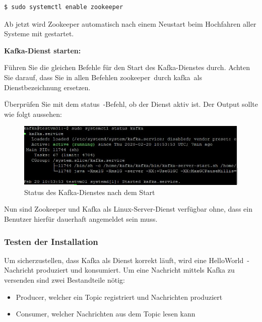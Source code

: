\documentclass[a4paper,titlepage,halfparskip,12pt]{scrreprt}
\begin{document}
\begin{onehalfspacing}
\smallskip

\begin{lstlisting}[language=Bash]
$ sudo systemctl enable zookeeper
\end{lstlisting}

Ab jetzt wird Zookeeper automatisch nach einem Neustart beim Hochfahren aller Systeme mit gestartet.

\textbf{Kafka-Dienst starten:}

\bigskip

Führen Sie die gleichen Befehle für den Start des Kafka-Dienstes durch. Achten Sie darauf, dass Sie in allen Befehlen \glqq zookeeper\grqq\ durch \glqq kafka\grqq\ als Dienstbezeichnung ersetzen.

\smallskip

Überprüfen Sie mit dem \glqq status\grqq\ -Befehl, ob der Dienst aktiv ist. Der Output sollte wie folgt aussehen:

\begin{figure}[h]
	\centering
	\includegraphics{images/StatusKafka}
	\caption{Status des Kafka-Dienstes nach dem Start}
	\label{img:StatusZookeeper}
\end{figure}

Nun sind Zookeeper und Kafka als Linux-Server-Dienst verfügbar ohne, dass ein Benutzer hierfür dauerhaft angemeldet sein muss.

\subsubsection*{Testen der Installation}

Um sicherzustellen, dass Kafka als Dienst korrekt läuft, wird eine \glqq HelloWorld\grqq\ -Nachricht produziert und konsumiert. Um eine Nachricht mittels Kafka zu versenden sind zwei Bestandteile nötig:

\begin{itemize}
\item Producer, welcher ein Topic registriert und Nachrichten produziert
\item Consumer, welcher Nachrichten aus dem Topic lesen kann
\end{itemize}


\end{onehalfspacing}
\end{document}
